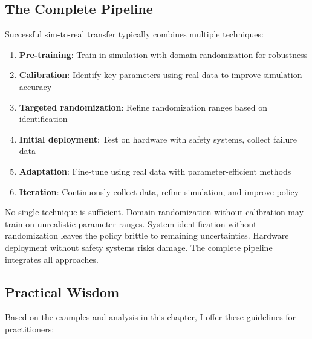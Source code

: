 \subsection{The Complete Pipeline}

Successful sim-to-real transfer typically combines multiple techniques:

\begin{enumerate}
    \item \textbf{Pre-training}: Train in simulation with domain randomization for robustness
    \item \textbf{Calibration}: Identify key parameters using real data to improve simulation accuracy
    \item \textbf{Targeted randomization}: Refine randomization ranges based on identification
    \item \textbf{Initial deployment}: Test on hardware with safety systems, collect failure data
    \item \textbf{Adaptation}: Fine-tune using real data with parameter-efficient methods
    \item \textbf{Iteration}: Continuously collect data, refine simulation, and improve policy
\end{enumerate}

No single technique is sufficient. Domain randomization without calibration may train on unrealistic parameter ranges. System identification without randomization leaves the policy brittle to remaining uncertainties. Hardware deployment without safety systems risks damage. The complete pipeline integrates all approaches.

\subsection{Practical Wisdom}

Based on the examples and analysis in this chapter, I offer these guidelines for practitioners:

